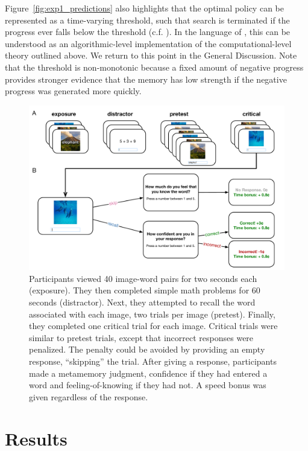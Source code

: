 Figure~\ref{fig:exp1_predictions} also highlights that the optimal policy can be represented as a time-varying threshold, such that search is terminated if the progress ever falls below the threshold (c.f. \citealp{drugowitsch2012cost}). In the language of \citet{marr1982vision}, this can be understood as an algorithmic-level implementation of the computational-level theory outlined above. We return to this point in the General Discussion. Note that the threshold is non-monotonic because a fixed amount of negative progress provides stronger evidence that the memory has low strength if the negative progress was generated more quickly.

\begin{figure}[htb!]
  \centering
  \includegraphics[width=\textwidth]{figs/memory/task_exp1.pdf}
  \caption{ 
     Participants viewed 40 image-word pairs for two seconds each (exposure). They then completed simple math problems for 60 seconds (distractor). Next, they attempted to recall the word associated with each image, two trials per image (pretest). Finally, they completed one critical trial for each image.
     Critical trials were similar to pretest trials, except that incorrect responses were penalized. The penalty could be avoided by providing an empty response, ``skipping'' the trial. After giving a response, participants made a metamemory judgment, confidence if they had entered a word and feeling-of-knowing if they had not. A speed bonus was given regardless of the response.}
  \label{fig:task-exp1}
\end{figure}

\section{Results}

